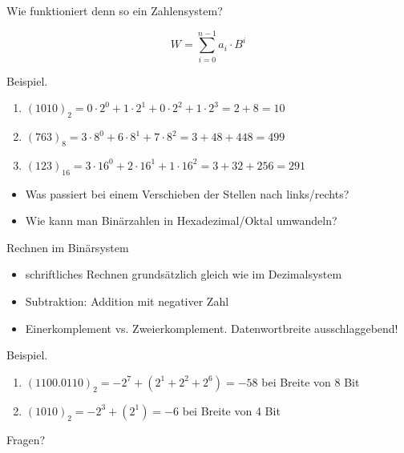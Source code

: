\begin{frame}[c]{Wie funktioniert denn so ein Zahlensystem?}{}

	\begin{equation}
		W=\sum_{i=0}^{n-1}a_i\cdot B^i
	\end{equation}
	\begin{block}{Beispiel.}
		\begin{enumerate}
			\item $(1010)_2 = 0\cdot 2^0+1\cdot 2^1+0\cdot 2^2+1\cdot 2^3=2+8=10$
			\item $(763)_8 = 3\cdot 8^0+6\cdot 8^1+7\cdot 8^2=3+48+448=499$
			\item $(123)_{16} = 3\cdot 16^0+2\cdot 16^1+1\cdot 16^2=3+32+256=291$
		\end{enumerate}
	\end{block}
	\hspace{1cm}
	\begin{itemize}
		\item Was passiert bei einem Verschieben der Stellen nach links/rechts?
		\item Wie kann man Binärzahlen in Hexadezimal/Oktal umwandeln?
	\end{itemize}
\end{frame}

\begin{frame}[c]{Rechnen im Binärsystem}{}
	\begin{itemize}
		\item schriftliches Rechnen grundsätzlich gleich wie im Dezimalsystem
		\item Subtraktion: Addition mit negativer Zahl
		\item Einerkomplement vs. Zweierkomplement. Datenwortbreite ausschlaggebend!
	\end{itemize}
	\vfill{}
	\begin{block}{Beispiel.}
		\begin{enumerate}
			\item $(1100.0110)_2 = -2^7+(2^1+2^2+2^6)=-58$ bei Breite von 8 Bit
			\item $(1010)_2 = -2^3 + (2^1) = -6$ bei Breite von 4 Bit
		\end{enumerate}
	\end{block}

\end{frame}

\begin{frame}[c]{}{}
	\begin{center}
		\LARGE Fragen?
	\end{center}
\end{frame}

